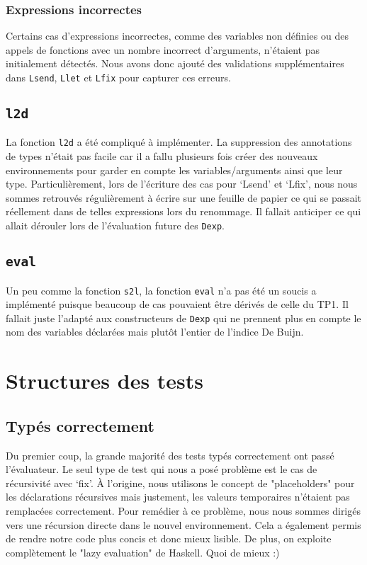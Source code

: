 \documentclass[a4paper,12pt]{article}
\begin{document}
    \subsubsection{Expressions incorrectes}
    Certains cas d’expressions incorrectes, comme des variables non définies ou des appels de fonctions avec un nombre incorrect d’arguments, n’étaient pas initialement détectés. Nous avons donc ajouté des validations supplémentaires dans \texttt{Lsend}, \texttt{Llet} et \texttt{Lfix} pour capturer ces erreurs.
    \subsection{\texttt{l2d}}
        La fonction \texttt{l2d} a été compliqué à implémenter. La suppression des annotations
        de types n'était pas facile car il a fallu plusieurs fois créer des nouveaux environnements
        pour garder en compte les variables/arguments ainsi que leur type. Particulièrement, lors
        de l'écriture des cas pour `Lsend' et `Lfix', nous nous sommes retrouvés régulièrement à
        écrire sur une feuille de papier ce qui se passait réellement dans de telles expressions
        lors du renommage. Il fallait anticiper ce qui allait dérouler lors de l'évaluation future
        des \texttt{Dexp}.
    \subsection{\texttt{eval}}
        Un peu comme la fonction \texttt{s2l}, la fonction \texttt{eval} n'a pas été un soucis
        a implémenté puisque beaucoup de cas pouvaient être dérivés de celle du TP1. Il fallait 
        juste l'adapté aux constructeurs de \texttt{Dexp} qui ne prennent plus en compte le
        nom des variables déclarées mais plutôt l'entier de l'indice De Buijn.

\newpage
\section{Structures des tests}
    \subsection{Typés correctement}
        Du premier coup, la grande majorité des tests typés correctement
        ont passé l'évaluateur. Le seul type de test qui nous a posé
        problème est le cas de récursivité avec `fix'. À l'origine,
        nous utilisons le concept de "placeholders" pour les déclarations
        récursives mais justement, les valeurs temporaires n'étaient pas
        remplacées correctement. Pour remédier à ce problème, nous nous
        sommes dirigés vers une récursion directe dans le nouvel environnement.
        Cela a également permis de rendre notre code plus concis et donc
        mieux lisible. De plus, on exploite complètement le "lazy evaluation"
        de Haskell. Quoi de mieux :)
\end{document}
